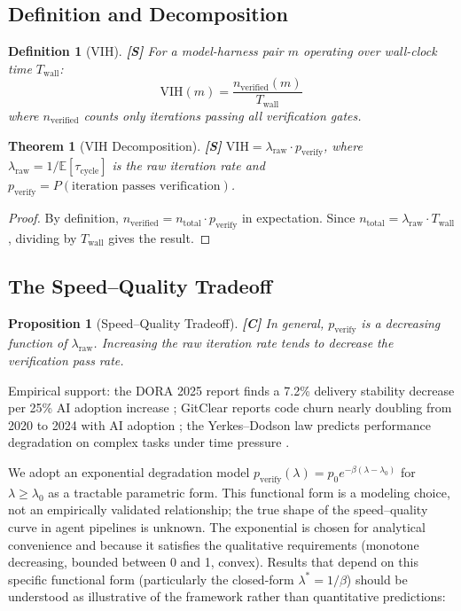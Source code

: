 \documentclass[11pt, a4paper, logo, copyright]{googledeepmind}
\newtheorem{definition}{Definition}[section]
\newtheorem{theorem}{Theorem}[section]
\newtheorem{proposition}{Proposition}[section]
\newcommand{\VIH}{\mathrm{VIH}}
\newcommand{\E}{\mathbb{E}}
\begin{document}
\subsection{Definition and Decomposition}

\begin{definition}[VIH]\label{def:vih}
\textbf{[S]} For a model-harness pair $m$ operating over wall-clock time $T_{\mathrm{wall}}$:
\[
    \VIH(m) = \frac{n_{\mathrm{verified}}(m)}{T_{\mathrm{wall}}}
\]
where $n_{\mathrm{verified}}$ counts only iterations passing all verification gates.
\end{definition}

\begin{theorem}[VIH Decomposition]\label{thm:vih-decomp}
\textbf{[S]} $\VIH = \lambda_{\mathrm{raw}} \cdot p_{\mathrm{verify}}$, where $\lambda_{\mathrm{raw}} = 1/\E[\tau_{\mathrm{cycle}}]$ is the raw iteration rate and $p_{\mathrm{verify}} = P(\text{iteration passes verification})$.
\end{theorem}

\begin{proof}
By definition, $n_{\mathrm{verified}} = n_{\mathrm{total}} \cdot p_{\mathrm{verify}}$ in expectation. Since $n_{\mathrm{total}} = \lambda_{\mathrm{raw}} \cdot T_{\mathrm{wall}}$, dividing by $T_{\mathrm{wall}}$ gives the result.
\end{proof}

\subsection{The Speed--Quality Tradeoff}

\begin{proposition}[Speed--Quality Tradeoff]\label{prop:tradeoff}
\textbf{[C]} In general, $p_{\mathrm{verify}}$ is a decreasing function of $\lambda_{\mathrm{raw}}$. Increasing the raw iteration rate tends to decrease the verification pass rate.
\end{proposition}

Empirical support: the DORA 2025 report finds a 7.2\% delivery stability decrease per 25\% AI adoption increase \citep{dora2025}; GitClear reports code churn nearly doubling from 2020 to 2024 with AI adoption \citep{gitclear2025}; the Yerkes--Dodson law predicts performance degradation on complex tasks under time pressure \citep{yerkes1908relation}.

We adopt an exponential degradation model $p_{\mathrm{verify}}(\lambda) = p_0 e^{-\beta(\lambda - \lambda_0)}$ for $\lambda \geq \lambda_0$ as a tractable parametric form. This functional form is a modeling choice, not an empirically validated relationship; the true shape of the speed--quality curve in agent pipelines is unknown. The exponential is chosen for analytical convenience and because it satisfies the qualitative requirements (monotone decreasing, bounded between 0 and 1, convex). Results that depend on this specific functional form (particularly the closed-form $\lambda^* = 1/\beta$) should be understood as illustrative of the framework rather than quantitative predictions:
\end{document}
